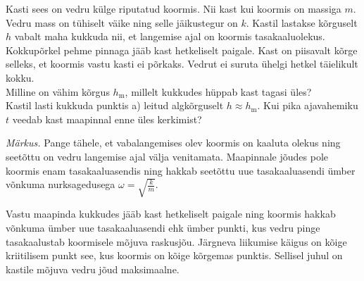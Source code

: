 
Kasti sees on vedru külge riputatud koormis. Nii kast kui koormis on massiga $m$. Vedru mass on tühiselt väike ning selle jäikustegur on $k$. Kastil lastakse kõrguselt $h$ vabalt maha kukkuda nii, et langemise ajal on koormis tasakaaluolekus. Kokkupõrkel pehme pinnaga jääb kast hetkeliselt paigale. Kast on piisavalt kõrge selleks, et koormis vastu kasti ei põrkaks. Vedrut ei suruta ühelgi hetkel täielikult kokku.\\
\osa Milline on vähim kõrgus $h_\text{m}$, millelt kukkudes hüppab kast tagasi üles?\\
\osa Kastil lasti kukkuda punktis a) leitud algkõrguselt $h\approx h_\text{m}$. Kui pika ajavahemiku $t$ veedab kast maapinnal enne üles kerkimist? 

\emph{Märkus.} Pange tähele, et vabalangemises olev koormis on kaaluta olekus ning seetõttu on vedru langemise ajal välja venitamata. Maapinnale jõudes pole koormis enam tasakaaluasendis ning hakkab seetõttu uue tasakaaluasendi ümber võnkuma nurksagedusega $\omega =\sqrt{\frac{k}{m}}$.

\hint
Vastu maapinda kukkudes jääb kast hetkeliselt paigale ning koormis hakkab võnkuma ümber uue tasakaaluasendi ehk ümber punkti, kus vedru pinge tasakaalustab koormisele mõjuva raskusjõu. Järgneva liikumise käigus on kõige kriitilisem punkt see, kus koormis on kõige kõrgemas punktis. Sellisel juhul on kastile mõjuva vedru jõud maksimaalne.


